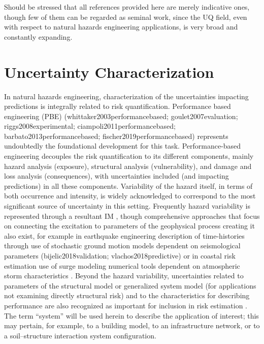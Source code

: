 Should be stressed that all references provided here are merely indicative ones, though few of them can be regarded as seminal work, since the UQ field, even with respect to natural hazards engineering applications, is very broad and constantly expanding.    

\section{Uncertainty Characterization}
\label{sec:uq_characterization}

In natural hazards engineering, characterization of the uncertainties impacting predictions is integrally related to risk quantification. Performance based engineering (PBE) (whittaker2003performancebased; goulet2007evaluation; riggs2008experimental; ciampoli2011performancebased; barbato2013performancebased; fischer2019performancebased) represents undoubtedly the foundational development for this task. Performance-based engineering decouples the risk quantification to its different components, mainly hazard analysis (exposure), structural analysis (vulnerability), and damage and loss analysis (consequences), with uncertainties included (and impacting predictions) in all these components. Variability of the hazard itself, in terms of both occurrence and intensity, is widely acknowledged to correspond to the most significant source of uncertainty in this setting. Frequently hazard variability is represented through a resultant IM \citep{baker2005vectorvalued,kohrangi2016implications}, though comprehensive approaches that focus on connecting the excitation to parameters of the geophysical process creating it also exist, for example in earthquake engineering description of time-histories through use of stochastic ground motion models dependent on seismological parameters (bijelic2018validation; vlachos2018predictive) or in coastal risk estimation use of surge modeling numerical tools dependent on atmospheric storm characteristics \citep{resio2007white}. Beyond the hazard variability, uncertainties related to parameters of the structural model or generalized system model (for applications not examining directly structural risk) and to the characteristics for describing performance are also recognized as important for inclusion in risk estimation \citep{porter2002sensitivity}. The term “system” will be used herein to describe the application of interest; this may pertain, for example, to a building model, to an infrastructure network, or to a soil–structure interaction system configuration. 

